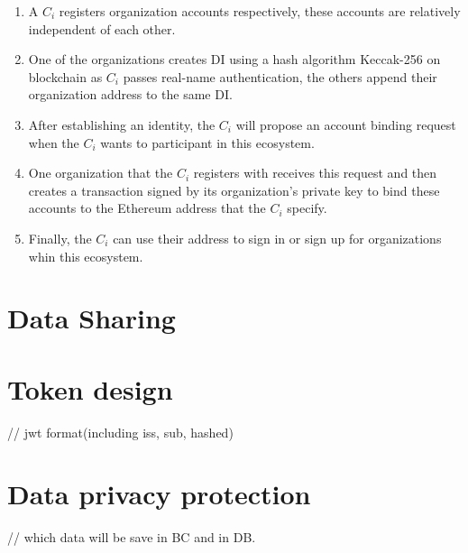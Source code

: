 \renewcommand\labelenumi{(\theenumi)}
\begin{enumerate}[noitemsep, topsep=0pt]
    \item A \(C_i\) registers organization accounts respectively, these accounts are relatively independent of each other.
    \item One of the organizations creates DI using a hash algorithm Keccak-256  on blockchain as \(C_i\) passes real-name authentication, the others append their organization address to the same DI.
    \item After establishing an identity, the \(C_i\) will propose an account binding request when the \(C_i\) wants to participant in this ecosystem.
    \item One organization that the \(C_i\) registers with receives this request and then creates a transaction signed by its organization's private key to bind these accounts to the Ethereum address that the \(C_i\) specify. 
    \item Finally, the \(C_i\) can use their address to sign in or sign up for organizations whin this ecosystem.
\end{enumerate}


\section{Data Sharing}
\section{Token design}
// jwt format(including iss, sub, hashed)
\section{Data privacy protection}
// which data will be save in BC and in DB.